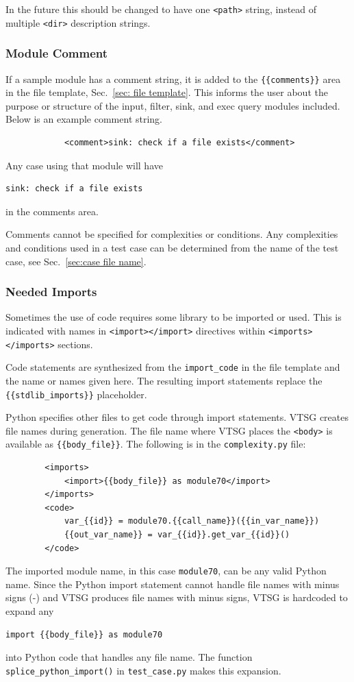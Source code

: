 In the future this should be changed to have one \verb|<path>| string, instead of
multiple \verb|<dir>| description strings.


\subsubsection{Module Comment}
\label{sec:module comment}

If a sample module has a comment string, it is added to the
\verb|{{comments}}| area in the file template, Sec.~\ref{sec: file template}.
This informs the user about the purpose or structure of the input, filter, sink, and
exec query modules included.  Below is an example comment string.

\begin{verbatim}
            <comment>sink: check if a file exists</comment>
\end{verbatim}

Any case using that module will have
\begin{verbatim}
sink: check if a file exists
\end{verbatim}
in the comments area.

Comments cannot be specified for complexities or conditions.  Any complexities and
conditions used in a test case can be determined from the name of the test case, see
Sec.~\ref{sec:case file name}.


\subsubsection{Needed Imports}
\label{sec:module import}

Sometimes the use of code requires some library to be imported or used.  This is
indicated with names in \verb|<import></import>| directives within
\verb|<imports></imports>| sections.

Code statements are synthesized from the \verb|import_code| in the file template and
the name or names given here.
The resulting import statements replace the \verb|{{stdlib_imports}}| placeholder.

Python specifies other files to get code through import statements.  VTSG creates
file names during generation.  The file name where VTSG places the \verb|<body>| is
available as \verb|{{body_file}}|.  The following is in the \verb|complexity.py| file:
\begin{verbatim}
        <imports>
            <import>{{body_file}} as module70</import>
        </imports>
        <code>
            var_{{id}} = module70.{{call_name}}({{in_var_name}})
            {{out_var_name}} = var_{{id}}.get_var_{{id}}()
        </code>
\end{verbatim}
The imported module name, in this case \verb|module70|, can be any valid Python
name.
Since the Python import statement cannot handle file names with minus signs (-) and
VTSG produces file names with minus signs, VTSG is hardcoded to expand any
\begin{verbatim}
import {{body_file}} as module70
\end{verbatim}
into Python code that handles any file name.
The function \verb|splice_python_import()| in \verb|test_case.py| makes this
expansion.


